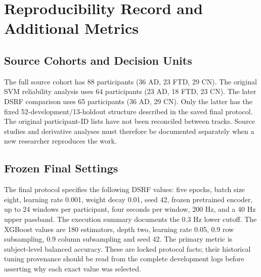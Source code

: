 \chapter{Reproducibility Record and Additional Metrics}
\label{app:reproducibility}
\section{Source Cohorts and Decision Units}
The full source cohort has 88 participants (36 AD, 23 FTD, 29 CN). The original SVM reliability analysis uses 64 participants (23 AD, 18 FTD, 23 CN). The later DSRF comparison uses 65 participants (36 AD, 29 CN). Only the latter has the fixed 52-development/13-holdout structure described in the saved final protocol. The original participant-ID lists have not been reconciled between tracks. Source studies and derivative analyses must therefore be documented separately when a new researcher reproduces the work.

\section{Frozen Final Settings}
The final protocol specifies the following DSRF values: five epochs, batch size eight, learning rate 0.001, weight decay 0.01, seed 42, frozen pretrained encoder, up to 24 windows per participant, four seconds per window, 200 Hz, and a 40 Hz upper passband. The execution summary documents the 0.3 Hz lower cutoff. The XGBoost values are 180 estimators, depth two, learning rate 0.05, 0.9 row subsampling, 0.9 column subsampling and seed 42. The primary metric is subject-level balanced accuracy. These are locked protocol facts; their historical tuning provenance should be read from the complete development logs before asserting why each exact value was selected.

